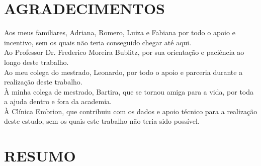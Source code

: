 \documentclass[12pt, a4paper]{report}
\theoremstyle{definition}
\theoremstyle{remark}
\theoremstyle{plain}
\begin{document}

\thispagestyle{empty}
\section*{\normalsize \centering \textbf{AGRADECIMENTOS}}

Aos meus familiares, Adriana, Romero, Luiza e Fabiana por todo o apoio e incentivo, sem os quais não teria conseguido chegar até aqui.
\\

Ao Professor Dr. Frederico Moreira Bublitz, por sua orientação e paciência ao longo deste trabalho.
\\

Ao meu colega do mestrado, Leonardo, por todo o apoio e parceria durante a realização deste trabalho.
\\

À minha colega de mestrado, Bartira, que se tornou amiga para a vida, por toda a ajuda dentro e fora da academia.
\\

À Clínica Embrion, que contribuiu com os dados e apoio técnico para a realização deste estudo, sem os quais este trabalho não teria sido possível.



\newpage



\thispagestyle{empty}
\section*{\normalsize \centering \textbf{RESUMO}}
\end{document}

